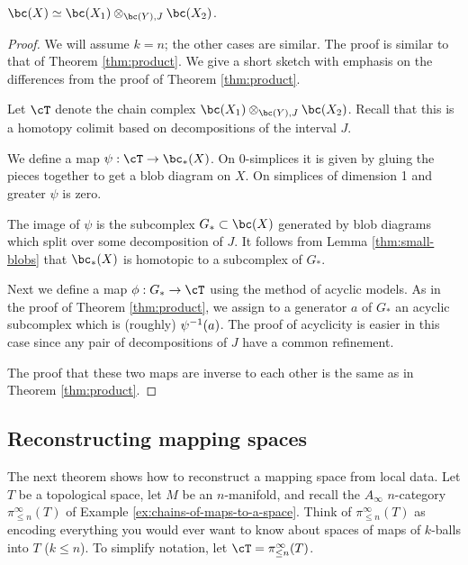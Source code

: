 \begin{thm}
\label{thm:gluing}
$\bc(X) \simeq \bc(X_1) \otimes_{\bc(Y), J} \bc(X_2)$.
\end{thm}

\begin{proof}
We will assume $k=n$; the other cases are similar.
The proof is similar to that of Theorem \ref{thm:product}.
We give a short sketch with emphasis on the differences from 
the proof of Theorem \ref{thm:product}.

Let $\cT$ denote the chain complex $\bc(X_1) \otimes_{\bc(Y), J} \bc(X_2)$.
Recall that this is a homotopy colimit based on decompositions of the interval $J$.

We define a map $\psi:\cT\to \bc_*(X)$.
On 0-simplices it is given
by gluing the pieces together to get a blob diagram on $X$.
On simplices of dimension 1 and greater $\psi$ is zero.

The image of $\psi$ is the subcomplex $G_*\sub \bc(X)$ generated by blob diagrams which split
over some decomposition of $J$.
It follows from Lemma \ref{thm:small-blobs} that $\bc_*(X)$ is homotopic to 
a subcomplex of $G_*$. 

Next we define a map $\phi:G_*\to \cT$ using the method of acyclic models.
As in the proof of Theorem \ref{thm:product}, we assign to a generator $a$ of $G_*$
an acyclic subcomplex which is (roughly) $\psi^{-1}(a)$.
The proof of acyclicity is easier in this case since any pair of decompositions of $J$ have
a common refinement.

The proof that these two maps are inverse to each other is the same as in
Theorem \ref{thm:product}.
\end{proof}

\medskip

\subsection{Reconstructing mapping spaces}
\label{sec:map-recon}

The next theorem shows how to reconstruct a mapping space from local data.
Let $T$ be a topological space, let $M$ be an $n$-manifold, 
and recall the $A_\infty$ $n$-category $\pi^\infty_{\leq n}(T)$ 
of Example \ref{ex:chains-of-maps-to-a-space}.
Think of $\pi^\infty_{\leq n}(T)$ as encoding everything you would ever
want to know about spaces of maps of $k$-balls into $T$ ($k\le n$).
To simplify notation, let $\cT = \pi^\infty_{\leq n}(T)$.

